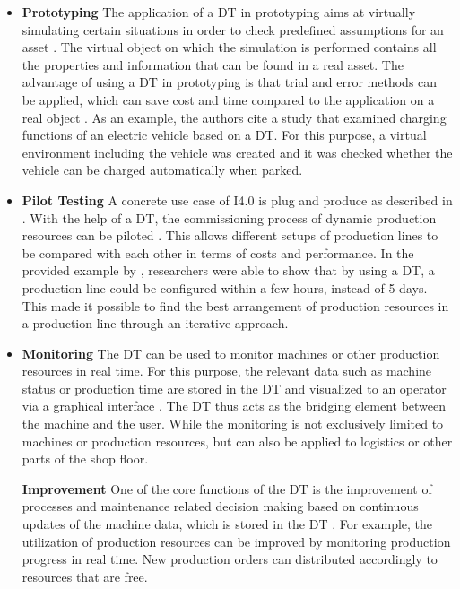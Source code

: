 \begin{itemize}
    \item [] \textbf{Prototyping} The application of a \ac{DT} in prototyping aims at virtually simulating certain situations in order to check predefined assumptions for an asset \cite[p. 7]{Son2021PastManufacturing}. The virtual object on which the simulation is performed contains all the properties and information that can be found in a real asset. The advantage of using a \ac{DT} in prototyping is that trial and error methods can be applied, which can save cost and time compared to the application on a real object \cite[p. 2]{Son2021PastManufacturing}. As an example, the authors cite a study that examined charging functions of an electric vehicle based on a \ac{DT}. For this purpose, a virtual environment including the vehicle was created and it was checked whether the vehicle can be charged automatically when parked.
    
    \item[] \textbf{Pilot Testing} A concrete use case of \ac{I4.0} is plug and produce as described in \cite{Schleipen2015Requirements4.0}. With the help of a \ac{DT}, the commissioning process of dynamic production resources can be piloted \cite[p. 9]{Son2021PastManufacturing}. This allows different setups of production lines to be compared with each other in terms of costs and performance. In the provided example by \citeauthor{Son2021PastManufacturing}, researchers were able to show that by using a \ac{DT}, a production line could be configured within a few hours, instead of 5 days. This made it possible to find the best arrangement of production resources in a production line through an iterative approach. 
    
    \item[] \textbf{Monitoring} The \ac{DT} can be used to monitor machines or other production resources in real time. For this purpose, the relevant data such as machine status or production time are stored in the \ac{DT} and visualized to an operator via a graphical interface \cite[p. 11]{Son2021PastManufacturing}. The \ac{DT} thus acts as the bridging element between the machine and the user. While the monitoring is not exclusively limited to machines or production resources, but can also be applied to logistics or other parts of the shop floor. 
    
    \textbf{Improvement} One of the core functions of the \ac{DT} is the improvement of processes and maintenance related decision making based on continuous updates of the machine data, which is stored in the \ac{DT} \cite[p. 14]{Son2021PastManufacturing}. For example, the utilization of production resources can be improved by monitoring production progress in real time. New production orders can distributed accordingly to resources that are free.
    

\end{itemize}
